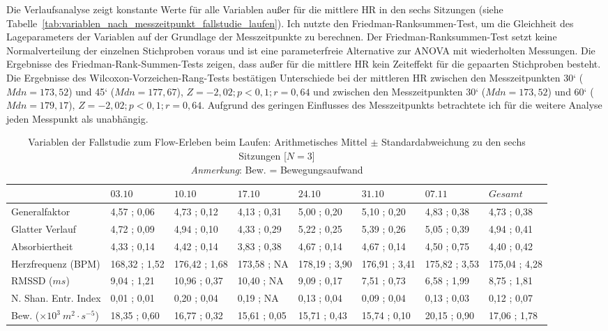 Die Verlaufsanalyse zeigt konstante Werte für alle Variablen außer für die mittlere \ac{HR} in den sechs Sitzungen (siehe Tabelle~\ref{tab:variablen_nach_messzeitpunkt_fallstudie_laufen}). Ich nutzte den Friedman-Ranksummen-Test, um die Gleichheit des Lageparameters der Variablen auf der Grundlage der Messzeitpunkte zu berechnen. Der Friedman-Ranksummen-Test setzt keine Normalverteilung der einzelnen Stichproben voraus und ist eine parameterfreie Alternative zur ANOVA mit wiederholten Messungen. Die Ergebnisse des Friedman-Rank-Summen-Tests zeigen, dass außer für die mittlere \ac{HR} kein Zeiteffekt für die gepaarten Stichproben besteht. Die Ergebnisse des Wilcoxon-Vorzeichen-Rang-Tests bestätigen Unterschiede bei der mittleren \ac{HR} zwischen den Messzeitpunkten 30‘ ($Mdn = 173{,}52$) und 45‘ ($Mdn = 177{,}67$), $Z = -2{,}02; p < 0{,}1; r = 0{,}64$ und zwischen den Messzeitpunkten 30‘ ($Mdn = 173{,}52$) und 60‘ ($Mdn = 179{,}17$), $Z = -2{,}02; p < 0{,}1; r = 0{,}64$. Aufgrund des geringen Einflusses des Messzeitpunkts betrachtete ich für die weitere Analyse jeden Messpunkt als unabhängig.

\begin{sidewaystable}
\centering
	\caption[Variablen zu den sechs Sitzungen (Fallstudie: Laufen)]{Variablen der Fallstudie zum Flow-Erleben beim Laufen: Arithmetisches Mittel $\pm$ Standardabweichung zu den sechs Sitzungen [$N = 3$] \\ \hspace{\textwidth}\emph{Anmerkung}: Bew. = Bewegungsaufwand}
	\label{tab:variablen_nach_sitzung_fallstudie_laufen}
	\begin{tabular}{lyyyyyyy}
\toprule
& $03.10$ & $10.10$ & $17.10$ & $24.10$ & $31.10$ & $07.11$ & $Gesamt$ \\
\midrule
Generalfaktor & 4{,}57 ; 0{,}06 & 4{,}73 ; 0{,}12 & 4{,}13 ; 0{,}31 & 5{,}00 ; 0{,}20 & 5{,}10 ; 0{,}20 & 4{,}83 ; 0{,}38 & 4{,}73 ; 0{,}38 \\
Glatter Verlauf & 4{,}72 ; 0{,}09 & 4{,}94 ; 0{,}10 & 4{,}33 ; 0{,}29 & 5{,}22 ; 0{,}25 & 5{,}39 ; 0{,}26 & 5{,}05 ; 0{,}39 & 4{,}94 ; 0{,}41 \\
Absorbiertheit & 4{,}33 ; 0{,}14 & 4{,}42 ; 0{,}14 & 3{,}83 ; 0{,}38 & 4{,}67 ; 0{,}14 & 4{,}67 ; 0{,}14 & 4{,}50 ; 0{,}75 & 4{,}40 ; 0{,}42 \\
Herzfrequenz (BPM) & 168{,}32 ; 1{,}52 & 176{,}42 ; 1{,}68 & 173{,}58 ; NA & 178{,}19 ; 3{,}90 & 176{,}91 ; 3{,}41 & 175{,}82 ; 3{,}53 & 175{,}04 ; 4{,}28 \\
RMSSD ($ms$) & 9{,}04 ; 1{,}21 & 10{,}96 ; 0{,}37 & 10{,}40 ; NA & 9{,}09 ; 0{,}17 & 7{,}51 ; 0{,}73 & 6{,}58 ; 1{,}99 & 8{,}75 ; 1{,}81 \\
N. Shan. Entr. Index & 0{,}01 ; 0{,}01 & 0{,}20 ; 0{,}04 & 0{,}19 ; NA & 0{,}13 ; 0{,}04 & 0{,}09 ; 0{,}04 & 0{,}13 ; 0{,}03 & 0{,}12 ; 0{,}07 \\
Bew. ($\times 10^3 \: m^2 \cdot s^{-5}$) & 18{,}35 ; 0{,}60 & 16{,}77 ; 0{,}32 & 15{,}61 ; 0{,}05 & 15{,}71 ; 0{,}43 & 15{,}74 ; 0{,}10 & 20{,}15 ; 0{,}90 & 17{,}06 ; 1{,}78 \\
\bottomrule
\end{tabular}
\end{sidewaystable}

